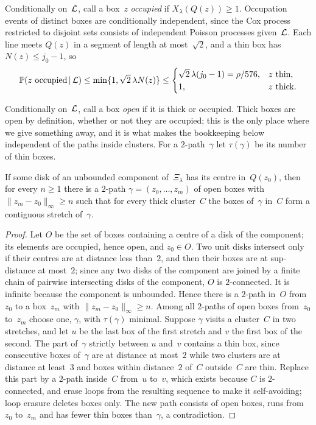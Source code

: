 \documentclass[11pt,letterpaper]{article}
\begin{document}
Conditionally on~$\mathcal L$, call a box~$z$ \emph{occupied} if $X_\lambda(Q(z))\ge1$. Occupation events of distinct boxes are conditionally independent, since the Cox process restricted to disjoint sets consists of independent Poisson processes given~$\mathcal L$. Each line meets $Q(z)$ in a segment of length at most~$\sqrt2$, and a thin box has $N(z)\le j_0-1$, so
\begin{equation}
\label{eq:occ}
  \mathbb P(z\text{ occupied}\,\vert\,\mathcal L)\le\min\{1,\sqrt2\,\lambda N(z)\}\le
  \begin{cases}\sqrt2\,\lambda(j_0-1)=\rho/576,& z\text{ thin},\\ 1,& z\text{ thick}.\end{cases}
\end{equation}

Conditionally on~$\mathcal L$, call a box \emph{open} if it is thick or occupied. Thick boxes are open by definition, whether or not they are occupied; this is the only place where we give something away, and it is what makes the bookkeeping below independent of the paths inside clusters. For a $2$-path~$\gamma$ let $\tau(\gamma)$ be its number of thin boxes.

\begin{lemma}
\label{lem:occpath}
If some disk of an unbounded component of~$\Xi_\lambda$ has its centre in~$Q(z_0)$, then for every $n\ge1$ there is a $2$-path $\gamma=(z_0,\dots,z_m)$ of open boxes with $\lVert z_m-z_0\rVert_\infty\ge n$ such that for every thick cluster~$C$ the boxes of~$\gamma$ in~$C$ form a contiguous stretch of~$\gamma$.
\end{lemma}

\begin{proof}
Let $O$ be the set of boxes containing a centre of a disk of the component; its elements are occupied, hence open, and $z_0\in O$. Two unit disks intersect only if their centres are at distance less than~$2$, and then their boxes are at sup-distance at most~$2$; since any two disks of the component are joined by a finite chain of pairwise intersecting disks of the component, $O$ is $2$-connected. It is infinite because the component is unbounded. Hence there is a $2$-path in~$O$ from~$z_0$ to a box~$z_m$ with $\lVert z_m-z_0\rVert_\infty\ge n$. Among all $2$-paths of open boxes from~$z_0$ to~$z_m$ choose one, $\gamma$, with $\tau(\gamma)$ minimal. Suppose $\gamma$ visits a cluster~$C$ in two stretches, and let $u$ be the last box of the first stretch and $v$ the first box of the second. The part of~$\gamma$ strictly between $u$ and~$v$ contains a thin box, since consecutive boxes of~$\gamma$ are at distance at most~$2$ while two clusters are at distance at least~$3$ and boxes within distance~$2$ of~$C$ outside~$C$ are thin. Replace this part by a $2$-path inside~$C$ from~$u$ to~$v$, which exists because $C$ is $2$-connected, and erase loops from the resulting sequence to make it self-avoiding; loop erasure deletes boxes only. The new path consists of open boxes, runs from~$z_0$ to~$z_m$ and has fewer thin boxes than~$\gamma$, a contradiction.
\end{proof}
\end{document}
